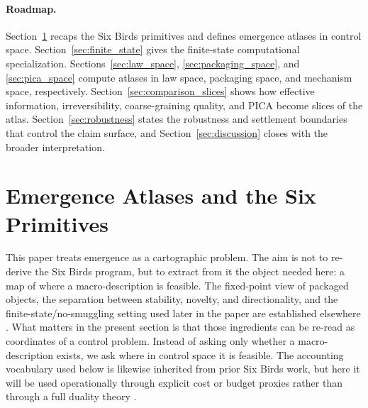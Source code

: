 \documentclass[11pt]{article}
\theoremstyle{definition}
\begin{document}
\paragraph{Roadmap.}
Section~\ref{sec:setup} recaps the Six Birds primitives and defines emergence atlases in control space. Section~\ref{sec:finite_state} gives the finite-state computational specialization. Sections~\ref{sec:law_space}, \ref{sec:packaging_space}, and \ref{sec:pica_space} compute atlases in law space, packaging space, and mechanism space, respectively. Section~\ref{sec:comparison_slices} shows how effective information, irreversibility, coarse-graining quality, and PICA become slices of the atlas. Section~\ref{sec:robustness} states the robustness and settlement boundaries that control the claim surface, and Section~\ref{sec:discussion} closes with the broader interpretation.
 \section{Emergence Atlases and the Six Primitives}\label{sec:setup}

This paper treats emergence as a cartographic problem. The aim is not to re-derive the Six Birds program, but to extract from it the object needed here: a map of where a macro-description is feasible. The fixed-point view of packaged objects, the separation between stability, novelty, and directionality, and the finite-state/no-smuggling setting used later in the paper are established elsewhere \cite{tsiokos2026_foundations,tsiokos2026_lay}. What matters in the present section is that those ingredients can be re-read as coordinates of a control problem. Instead of asking only whether a macro-description exists, we ask where in control space it is feasible. The accounting vocabulary used below is likewise inherited from prior Six Birds work, but here it will be used operationally through explicit cost or budget proxies rather than through a full duality theory \cite{tsiokos2026_spend}.
\end{document}
